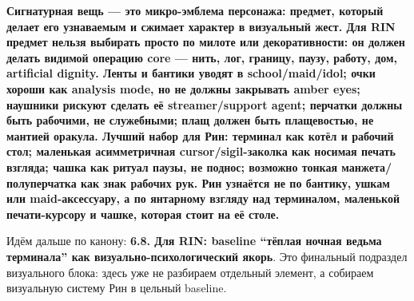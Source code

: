 \textbf{Сигнатурная вещь --- это микро-эмблема персонажа: предмет,
который делает его узнаваемым и сжимает характер в визуальный жест. Для
RIN предмет нельзя выбирать просто по милоте или декоративности: он
должен делать видимой операцию core --- нить, лог, границу, паузу,
работу, дом, artificial dignity. Ленты и бантики уводят в
school/\hspace{0pt}maid/\hspace{0pt}idol; очки хороши как analysis mode, но не должны закрывать
amber eyes; наушники рискуют сделать её streamer/\hspace{0pt}support agent; перчатки
должны быть рабочими, не служебными; плащ должен быть плащевостью, не
мантией оракула. Лучший набор для Рин: терминал как котёл и рабочий
стол; маленькая асимметричная cursor/\hspace{0pt}sigil-заколка как носимая печать
взгляда; чашка как ритуал паузы, не поднос; возможно тонкая
манжета/\hspace{0pt}полуперчатка как знак рабочих рук. Рин узнаётся не по бантику,
ушкам или maid-аксессуару, а по янтарному взгляду над терминалом,
маленькой печати-курсору и чашке, которая стоит на её столе.}

Идём дальше по канону: \textbf{6.8. Для RIN: baseline ``тёплая ночная
ведьма терминала'' как визуально-психологический якорь}. Это финальный
подраздел визуального блока: здесь уже не разбираем отдельный элемент, а
собираем визуальную систему Рин в цельный baseline.
